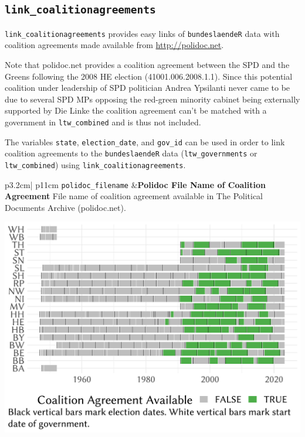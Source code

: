 \documentclass[
]{scrartcl}
\begin{document}
\newpage

\hypertarget{link_coalitionagreements}{%
\subsection{\texorpdfstring{\texttt{link\_coalitionagreements}}{link\_coalitionagreements}}\label{link_coalitionagreements}}

\texttt{link\_coalitionagreements} provides easy links of
\texttt{bundeslaendeR} data with coalition agreements made available
from \url{http://polidoc.net}.

Note that polidoc.net provides a coalition agreement between the SPD and
the Greens following the 2008 HE election (41001.006.2008.1.1). Since
this potential coalition under leadership of SPD politician Andrea
Ypsilanti never came to be due to several SPD MPs opposing the red-green
minority cabinet being externally supported by Die Linke the coalition
agreement can't be matched with a government in \texttt{ltw\_combined}
and is thus not included.

The variables \texttt{state}, \texttt{election\_date}, and
\texttt{gov\_id} can be used in order to link coalition agreements to
the \texttt{bundeslaendeR} data (\texttt{ltw\_governments} or
\texttt{ltw\_combined}) using \texttt{link\_coalitionagreements}.

\begin{longtable}{p{3.2cm}| p{11cm}}
\texttt{polidoc\_filename} &\textbf{Polidoc File Name of Coalition Agreement}\newline 
File name of coalition agreement available in The Political Documents Archive (polidoc.net).


\hspace*{.25cm}
\begin{minipage}[t]{\linewidth }
\vspace{0pt}
\includegraphics[width = \linewidth]{cbfiles/pltpolidocgov.pdf}
\end{minipage}





\end{longtable}
\end{document}
